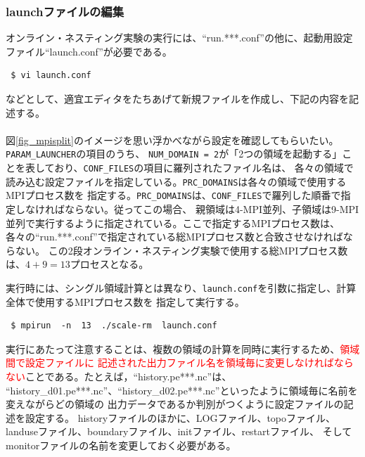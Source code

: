 

\subsubsection{launchファイルの編集}
オンライン・ネスティング実験の実行には、``run.***.conf''の他に、起動用設定ファイル``launch.conf''が必要である。
\begin{verbatim}
 $ vi launch.conf
\end{verbatim}
などとして、適宜エディタをたちあげて新規ファイルを作成し、下記の内容を記述する。\\

\\

\noindent 図\ref{fig_mpisplit}のイメージを思い浮かべながら設定を確認してもらいたい。\verb|PARAM_LAUNCHER|の項目のうち、
\verb|NUM_DOMAIN = 2|が「2つの領域を起動する」ことを表しており、\verb|CONF_FILES|の項目に羅列されたファイル名は、
各々の領域で読み込む設定ファイルを指定している。\verb|PRC_DOMAINS|は各々の領域で使用するMPIプロセス数を
指定する。\verb|PRC_DOMAINS|は、\verb|CONF_FILES|で羅列した順番で指定しなければならない。従ってこの場合、
親領域は4-MPI並列、子領域は9-MPI並列で実行するように指定されている。ここで指定するMPIプロセス数は、
各々の``run.***.conf''で指定されている総MPIプロセス数と合致させなければならない。
この2段オンライン・ネスティング実験で使用する総MPIプロセス数は、$4 + 9 = 13$プロセスとなる。

実行時には、シングル領域計算とは異なり、\verb|launch.conf|を引数に指定し、計算全体で使用するMPIプロセス数を
指定して実行する。
\begin{verbatim}
 $ mpirun  -n  13  ./scale-rm  launch.conf
\end{verbatim}

実行にあたって注意することは、複数の領域の計算を同時に実行するため、\textcolor{red}{領域間で設定ファイルに
記述された出力ファイル名を領域毎に変更しなければならない}ことである。たとえば，``history.pe***.nc''は、
``history\_d01.pe***.nc''、``history\_d02.pe***.nc''といったように領域毎に名前を変えながらどの領域の
出力データであるか判別がつくように設定ファイルの記述を設定する。
historyファイルのほかに、LOGファイル、topoファイル、landuseファイル、boundaryファイル、initファイル、restartファイル、
そしてmonitorファイルの名前を変更しておく必要がある。

